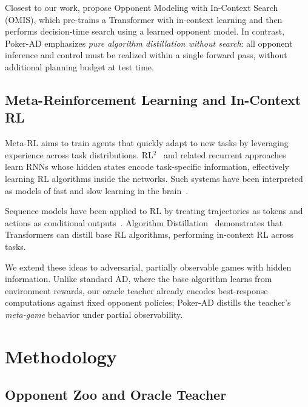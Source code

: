 \documentclass{article}
\begin{document}
Closest to our work, \citet{jing2024omis} propose Opponent Modeling with In-Context Search (OMIS), which pre-trains a Transformer with in-context learning and then performs decision-time search using a learned opponent model. In contrast, Poker-AD emphasizes \emph{pure algorithm distillation without search}: all opponent inference and control must be realized within a single forward pass, without additional planning budget at test time.

\subsection{Meta-Reinforcement Learning and In-Context RL}

Meta-RL aims to train agents that quickly adapt to new tasks by leveraging experience across task distributions. RL$^2$~\citep{duan2016rl2} and related recurrent approaches~\citep{wang2016learning2rl} learn RNNs whose hidden states encode task-specific information, effectively learning RL algorithms inside the networks. Such systems have been interpreted as models of fast and slow learning in the brain~\citep{botvinick2019fastslow}.

Sequence models have been applied to RL by treating trajectories as tokens and actions as conditional outputs~\citep{chen2021decisiontransformer}. Algorithm Distillation~\citep{laskin2023context} demonstrates that Transformers can distill base RL algorithms, performing in-context RL across tasks.

We extend these ideas to adversarial, partially observable games with hidden information. Unlike standard AD, where the base algorithm learns from environment rewards, our oracle teacher already encodes best-response computations against fixed opponent policies; Poker-AD distills the teacher's \emph{meta-game} behavior under partial observability.

\section{Methodology}
\label{sec:method}

\subsection{Opponent Zoo and Oracle Teacher}
\label{sec:oracle}
\end{document}
